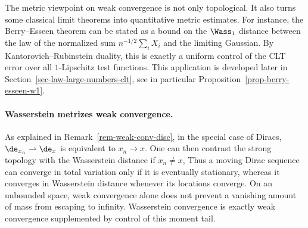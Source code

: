 \begin{rem}\label{rem-wasserstein-berry-esseen-pointer}
	The metric viewpoint on weak convergence is not only topological. It also turns some classical limit theorems into quantitative metric estimates. For instance, the Berry--Esseen theorem can be stated as a bound on the \(\Wass_1\) distance between the law of the normalized sum \(n^{-1/2}\sum_i X_i\) and the limiting Gaussian. By Kantorovich--Rubinstein duality, this is exactly a uniform control of the CLT error over all \(1\)-Lipschitz test functions. This application is developed later in Section~\ref{sec-law-large-numbers-clt}, see in particular Proposition~\ref{prop-berry-esseen-w1}.
	\end{rem}



\paragraph{Wasserstein metrizes weak convergence.}

As explained in Remark~\ref{rem-weak-conv-disc}, in the special case of Diracs, $\de_{x_n} \rightharpoonup \de_x$  is equivalent to $x_n \rightarrow x$. One can then contrast the strong topology with the Wasserstein distance if $x_n \neq x$,
Thus a moving Dirac sequence can converge in total variation only if it is eventually stationary, whereas it converges in Wasserstein distance whenever its locations converge. On an unbounded space, weak convergence alone does not prevent a vanishing amount of mass from escaping to infinity. Wasserstein convergence is exactly weak convergence supplemented by control of this moment tail.

